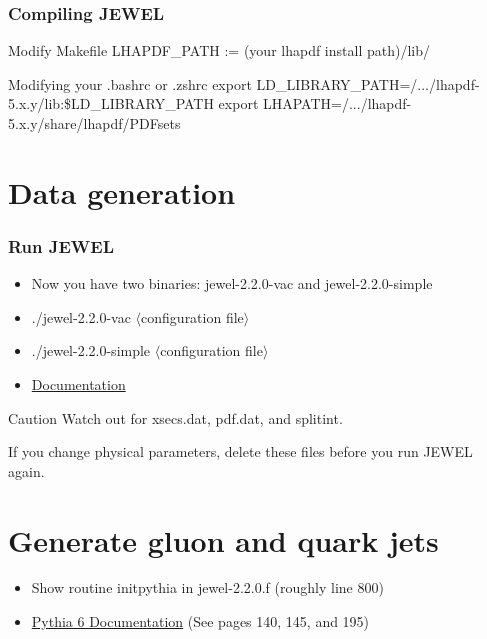 \documentclass{beamer}
\begin{document}
\begin{frame}
 \frametitle{Compiling JEWEL}
 \begin{block}{Modify Makefile}
 LHAPDF\_PATH := (your lhapdf install path)/lib/
 \end{block}

 \begin{block}{Modifying your .bashrc or .zshrc}
 export LD\_LIBRARY\_PATH=/.../lhapdf-5.x.y/lib:\$LD\_LIBRARY\_PATH
 export LHAPATH=/.../lhapdf-5.x.y/share/lhapdf/PDFsets
 \end{block}
\end{frame}


\section{Data generation}
\begin{frame}
\frametitle{Run JEWEL}
\begin{itemize}
 \item Now you have two binaries: jewel-2.2.0-vac and jewel-2.2.0-simple
 \item ./jewel-2.2.0-vac $\langle$configuration file$\rangle$
 \item ./jewel-2.2.0-simple $\langle$configuration file$\rangle$
 \item \href{https://arxiv.org/pdf/1311.0048.pdf}{Documentation}
\end{itemize}

\begin{alertblock}{Caution}
Watch out for xsecs.dat, pdf.dat, and splitint.

If you change physical parameters, delete these files before you run JEWEL again.
\end{alertblock}



\end{frame}

\section{Generate gluon and quark jets}

\begin{frame}
 \begin{itemize}
  \item Show routine initpythia in jewel-2.2.0.f (roughly line 800)
  \item \href{https://pythia.org/download/pythia6/lutp0613man2.pdf}{Pythia 6 Documentation} (See pages 140, 145, and 195)
 \end{itemize}


\end{frame}
\end{document}

